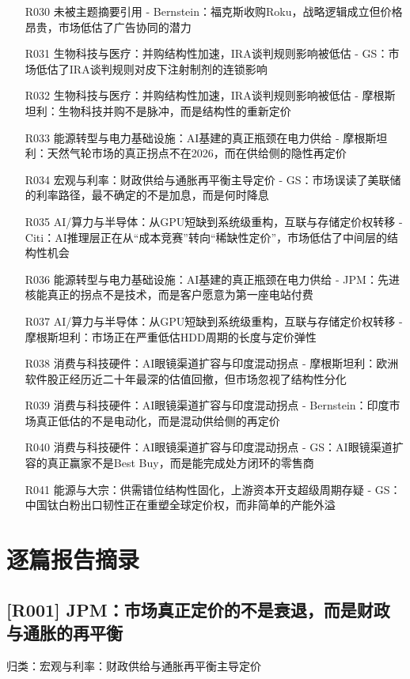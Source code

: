 \documentclass[11pt]{ctexart}
\begin{document}
\begin{itemize}
  \item [R030] 未被主题摘要引用 - Bernstein：福克斯收购Roku，战略逻辑成立但价格昂贵，市场低估了广告协同的潜力
  \item [R031] 生物科技与医疗：并购结构性加速，IRA谈判规则影响被低估 - GS：市场低估了IRA谈判规则对皮下注射制剂的连锁影响
  \item [R032] 生物科技与医疗：并购结构性加速，IRA谈判规则影响被低估 - 摩根斯坦利：生物科技并购不是脉冲，而是结构性的重新定价
  \item [R033] 能源转型与电力基础设施：AI基建的真正瓶颈在电力供给 - 摩根斯坦利：天然气轮市场的真正拐点不在2026，而在供给侧的隐性再定价
  \item [R034] 宏观与利率：财政供给与通胀再平衡主导定价 - GS：市场误读了美联储的利率路径，最不确定的不是加息，而是何时降息
  \item [R035] AI/算力与半导体：从GPU短缺到系统级重构，互联与存储定价权转移 - Citi：AI推理层正在从“成本竞赛”转向“稀缺性定价”，市场低估了中间层的结构性机会
  \item [R036] 能源转型与电力基础设施：AI基建的真正瓶颈在电力供给 - JPM：先进核能真正的拐点不是技术，而是客户愿意为第一座电站付费
  \item [R037] AI/算力与半导体：从GPU短缺到系统级重构，互联与存储定价权转移 - 摩根斯坦利：市场正在严重低估HDD周期的长度与定价弹性
  \item [R038] 消费与科技硬件：AI眼镜渠道扩容与印度混动拐点 - 摩根斯坦利：欧洲软件股正经历近二十年最深的估值回撤，但市场忽视了结构性分化
  \item [R039] 消费与科技硬件：AI眼镜渠道扩容与印度混动拐点 - Bernstein：印度市场真正低估的不是电动化，而是混动供给侧的再定价
  \item [R040] 消费与科技硬件：AI眼镜渠道扩容与印度混动拐点 - GS：AI眼镜渠道扩容的真正赢家不是Best Buy，而是能完成处方闭环的零售商
  \item [R041] 能源与大宗：供需错位结构性固化，上游资本开支超级周期存疑 - GS：中国钛白粉出口韧性正在重塑全球定价权，而非简单的产能外溢
\end{itemize}
\section{逐篇报告摘录}
\subsection{[R001] JPM：市场真正定价的不是衰退，而是财政与通胀的再平衡}
{\small\color{refgray}归类：宏观与利率：财政供给与通胀再平衡主导定价}
\end{document}
